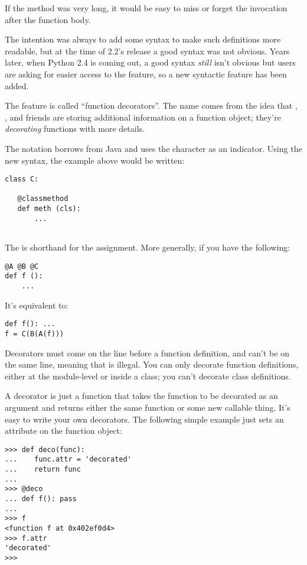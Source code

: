 \documentclass{howto}
\begin{document}
If the method was very long, it would be easy to miss or forget the
 invocation after the function body.  

The intention was always to add some syntax to make such definitions
more readable, but at the time of 2.2's release a good syntax was not
obvious.  Years later, when Python 2.4 is coming out, a good syntax
\emph{still} isn't obvious but users are asking for easier access to
the feature, so a new syntactic feature has been added.

The feature is called ``function decorators''.  The name comes from
the idea that , , and
friends are storing additional information on a function object; they're
\emph{decorating} functions with more details.  

The notation borrows from Java and uses the  character as an
indicator.  Using the new syntax, the example above would be written:

\begin{verbatim}
class C:

   @classmethod
   def meth (cls):
       ...
   
\end{verbatim}

The  is shorthand for the
 assignment.  More generally, if you have
the following:

\begin{verbatim}
@A @B @C
def f ():
    ...
\end{verbatim}

It's equivalent to:

\begin{verbatim}
def f(): ...
f = C(B(A(f)))
\end{verbatim}

Decorators must come on the line before a function definition, and
can't be on the same line, meaning that  is
illegal.  You can only decorate function definitions, either at the
module-level or inside a class; you can't decorate class definitions.

A decorator is just a function that takes the function to be decorated
as an argument and returns either the same function or some new
callable thing.  It's easy to write your own decorators.  The
following simple example just sets an attribute on the function
object:

\begin{verbatim}
>>> def deco(func):
...    func.attr = 'decorated'
...    return func
...
>>> @deco
... def f(): pass
...
>>> f
<function f at 0x402ef0d4>
>>> f.attr
'decorated'
>>>
\end{verbatim}
\end{document}
